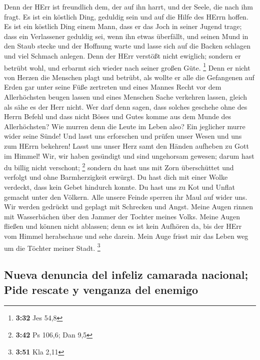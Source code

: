 Denn der HErr ist freundlich dem, der auf ihn harrt, und
der Seele, die nach ihm fragt.  Es ist ein köstlich Ding,
geduldig sein und auf die Hilfe des HErrn hoffen.  Es ist
ein köstlich Ding einem Mann, dass er das Joch in seiner Jugend trage;
 dass ein Verlassener geduldig sei, wenn ihn etwas
überfällt,  und seinen Mund in den Staub stecke und der
Hoffnung warte  und lasse sich auf die Backen schlagen
und viel Schmach anlegen.  Denn der HErr verstößt nicht
ewiglich;  sondern er betrübt wohl, und erbarmt sich
wieder nach seiner großen Güte. \footnote{\textbf{3:32} Jes 54,8}
 Denn er nicht von Herzen die Menschen plagt und betrübt,
 als wollte er alle die Gefangenen auf Erden gar unter
seine Füße zertreten  und eines Mannes Recht vor dem
Allerhöchsten beugen lassen  und eines Menschen Sache
verkehren lassen, gleich als sähe es der Herr nicht.  Wer
darf denn sagen, dass solches geschehe ohne des Herrn Befehl
 und dass nicht Böses und Gutes komme aus dem Munde des
Allerhöchsten?  Wie murren denn die Leute im Leben also?
Ein jeglicher murre wider seine Sünde!  Und lasst uns
erforschen und prüfen unser Wesen und uns zum HErrn bekehren!
 Lasst uns unser Herz samt den Händen aufheben zu Gott im
Himmel!  Wir, wir haben gesündigt und sind ungehorsam
gewesen; darum hast du billig nicht verschont; \footnote{\textbf{3:42}
  Ps 106,6; Dan 9,5}  sondern du hast uns mit Zorn
überschüttet und verfolgt und ohne Barmherzigkeit erwürgt.
 Du hast dich mit einer Wolke verdeckt, dass kein Gebet
hindurch konnte.  Du hast uns zu Kot und Unflat gemacht
unter den Völkern.  Alle unsere Feinde sperren ihr Maul
auf wider uns.  Wir werden gedrückt und geplagt mit
Schrecken und Angst.  Meine Augen rinnen mit Wasserbächen
über den Jammer der Tochter meines Volks.  Meine Augen
fließen und können nicht ablassen; denn es ist kein Aufhören da,
 bis der HErr vom Himmel herabschaue und sehe darein.
 Mein Auge frisst mir das Leben weg um die Töchter meiner
Stadt. \footnote{\textbf{3:51} Kla 2,11}

\hypertarget{nueva-denuncia-del-infeliz-camarada-nacional-pide-rescate-y-venganza-del-enemigo}{%
\subsection{Nueva denuncia del infeliz camarada nacional; Pide rescate y
venganza del
enemigo}\label{nueva-denuncia-del-infeliz-camarada-nacional-pide-rescate-y-venganza-del-enemigo}}

